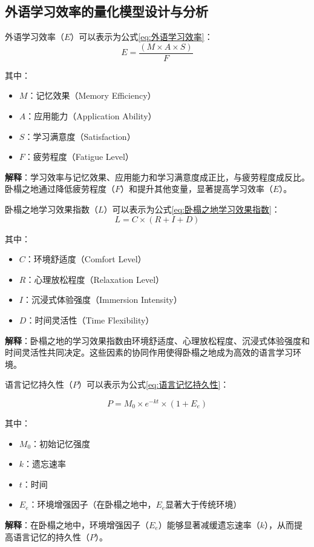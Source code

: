 \subsection{外语学习效率的量化模型设计与分析}

外语学习效率（$E$）可以表示为公式\ref{eq:外语学习效率}：
\begin{equation}
    E = \frac{(M \times A \times S)}{F}
    \label{eq:外语学习效率}
\end{equation}

其中：
\begin{itemize}
    \item $M$：记忆效果（Memory Efficiency）
    \item $A$：应用能力（Application Ability）
    \item $S$：学习满意度（Satisfaction）
    \item $F$：疲劳程度（Fatigue Level）
\end{itemize}

\textbf{解释}：学习效率与记忆效果、应用能力和学习满意度成正比，与疲劳程度成反比。卧榻之地通过降低疲劳程度（$F$）和提升其他变量，显著提高学习效率（$E$）。

\vspace{2em}

卧榻之地学习效果指数（$L$）可以表示为公式\ref{eq:卧榻之地学习效果指数}：
\begin{equation}
    L = C \times (R + I + D)
    \label{eq:卧榻之地学习效果指数}
\end{equation}


其中：
\begin{itemize}
    \item $C$：环境舒适度（Comfort Level）
    \item $R$：心理放松程度（Relaxation Level）
    \item $I$：沉浸式体验强度（Immersion Intensity）
    \item $D$：时间灵活性（Time Flexibility）
\end{itemize}

\textbf{解释}：卧榻之地的学习效果指数由环境舒适度、心理放松程度、沉浸式体验强度和时间灵活性共同决定。这些因素的协同作用使得卧榻之地成为高效的语言学习环境。

\vspace{2em}

语言记忆持久性（$P$）可以表示为公式\ref{eq:语言记忆持久性}：

\begin{equation}
    P = M_0 \times e^{-kt} \times (1 + E_e)
    \label{eq:语言记忆持久性}
\end{equation}

其中：
\begin{itemize}
    \item $M_0$：初始记忆强度
    \item $k$：遗忘速率
    \item $t$：时间
    \item $E_e$：环境增强因子（在卧榻之地中，$E_e$显著大于传统环境）
\end{itemize}

\textbf{解释}：在卧榻之地中，环境增强因子（$E_e$）能够显著减缓遗忘速率（$k$），从而提高语言记忆的持久性（$P$）。







